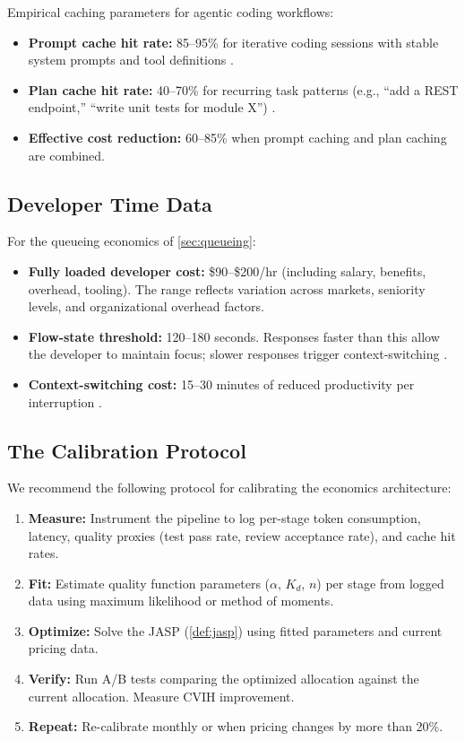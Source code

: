 \documentclass[11pt, a4paper, copyright]{googledeepmind}
\begin{document}
Empirical caching parameters for agentic coding workflows:
\begin{itemize}[nosep]
    \item \textbf{Prompt cache hit rate:} 85--95\% for iterative coding sessions with stable system prompts and tool definitions \citep{anthropic2026coding, liang2026cache}.
    \item \textbf{Plan cache hit rate:} 40--70\% for recurring task patterns (e.g., ``add a REST endpoint,'' ``write unit tests for module X'') \citep{zhang2025plancache}.
    \item \textbf{Effective cost reduction:} 60--85\% when prompt caching and plan caching are combined.
\end{itemize}

\subsection{Developer Time Data}

For the queueing economics of \cref{sec:queueing}:
\begin{itemize}[nosep]
    \item \textbf{Fully loaded developer cost:} \$90--\$200/hr (including salary, benefits, overhead, tooling). The range reflects variation across markets, seniority levels, and organizational overhead factors.
    \item \textbf{Flow-state threshold:} 120--180 seconds. Responses faster than this allow the developer to maintain focus; slower responses trigger context-switching \citep{mark2008interrupted, leroy2009}.
    \item \textbf{Context-switching cost:} 15--30 minutes of reduced productivity per interruption \citep{mark2008interrupted}.
\end{itemize}

\subsection{The Calibration Protocol}

We recommend the following protocol for calibrating the economics architecture:
\begin{enumerate}[nosep]
    \item \textbf{Measure:} Instrument the pipeline to log per-stage token consumption, latency, quality proxies (test pass rate, review acceptance rate), and cache hit rates.
    \item \textbf{Fit:} Estimate quality function parameters ($\alpha$, $K_d$, $n$) per stage from logged data using maximum likelihood or method of moments.
    \item \textbf{Optimize:} Solve the JASP (\cref{def:jasp}) using fitted parameters and current pricing data.
    \item \textbf{Verify:} Run A/B tests comparing the optimized allocation against the current allocation. Measure CVIH improvement.
    \item \textbf{Repeat:} Re-calibrate monthly or when pricing changes by more than 20\%.
\end{enumerate}
\end{document}
